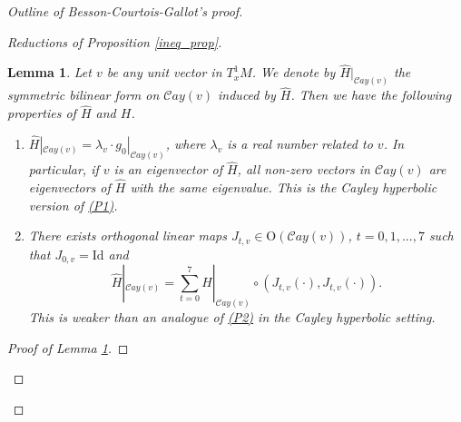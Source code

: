 \documentclass{article}
\newcommand{\id}{\mathrm{Id}}
\newcommand{\Cay}{\mathcal{C}ay}
\newtheorem{lem}[thm]{Lemma}
\theoremstyle{definition}
\begin{document}
\begin{proof}[Outline of Besson-Courtois-Gallot's proof]
\begin{proof}[Reductions of Proposition \ref{ineq_prop}]
\begin{lem}\label{octonion_struct}
Let $v$ be any unit vector in $T^1_xM$. We denote by $\widehat{H}|_{\Cay(v)}$ the symmetric bilinear form on $\Cay(v)$ induced by $\widehat H$. Then we have the following properties of $\widehat H$ and $H$.
\begin{enumerate}
\item[\hypertarget{PP1}{(P1').}] $\widehat{H}|_{\Cay(v)}=\lambda_v\cdot g_0|_{\Cay(v)}$, where $\lambda_v$ is a real number related to $v$. In particular, if $v$ is an eigenvector of $\widehat H$, all non-zero vectors in $\Cay(v)$ are eigenvectors of $\widehat H$ with the same eigenvalue. This is the Cayley hyperbolic version of \hyperlink{P1}{(P1)}.
\item[\hypertarget{PP2}{(P2').}] There exists orthogonal linear maps $J_{t,v}\in \mathrm{O}(\Cay(v))$, $t=0,1,...,7$ such that $J_{0,v}=\id$ and 
$$\widehat{H}|_{\Cay(v)}=\sum_{t=0}^7 H|_{\Cay(v)}\circ (J_{t,v}(\cdot),J_{t,v}(\cdot)).$$
This is weaker than an analogue of \hyperlink{P2}{(P2)} in the Cayley hyperbolic setting.
\end{enumerate}
\end{lem}
\begin{proof}[Proof of Lemma \ref{octonion_struct}]


\end{proof}
\end{proof}
\end{proof}
\end{document}
